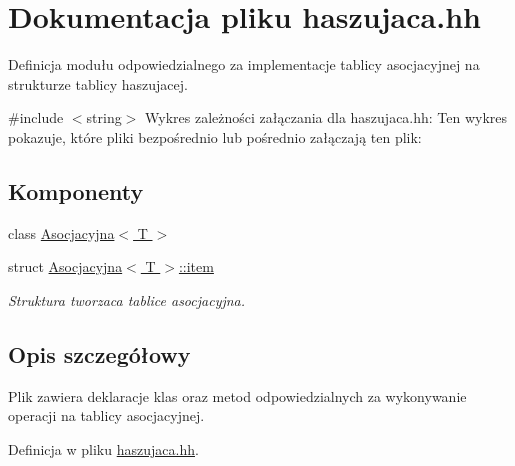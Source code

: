 \hypertarget{haszujaca_8hh}{\section{\-Dokumentacja pliku haszujaca.\-hh}
\label{haszujaca_8hh}
}


\-Definicja modułu odpowiedzialnego za implementacje tablicy asocjacyjnej na strukturze tablicy haszujacej.  


{\ttfamily \#include $<$string$>$}\*
\-Wykres zależności załączania dla haszujaca.\-hh\-:
\-Ten wykres pokazuje, które pliki bezpośrednio lub pośrednio załączają ten plik\-:
\subsection*{\-Komponenty}
\begin{DoxyCompactItemize}
\item 
class \hyperlink{class_asocjacyjna}{\-Asocjacyjna$<$ T $>$}
\item 
struct \hyperlink{struct_asocjacyjna_1_1item}{\-Asocjacyjna$<$ T $>$\-::item}
\begin{DoxyCompactList}\small\item\em \-Struktura tworzaca tablice asocjacyjna. \end{DoxyCompactList}\end{DoxyCompactItemize}


\subsection{\-Opis szczegółowy}
\-Plik zawiera deklaracje klas oraz metod odpowiedzialnych za wykonywanie operacji na tablicy asocjacyjnej. 

\-Definicja w pliku \hyperlink{haszujaca_8hh_source}{haszujaca.\-hh}.

